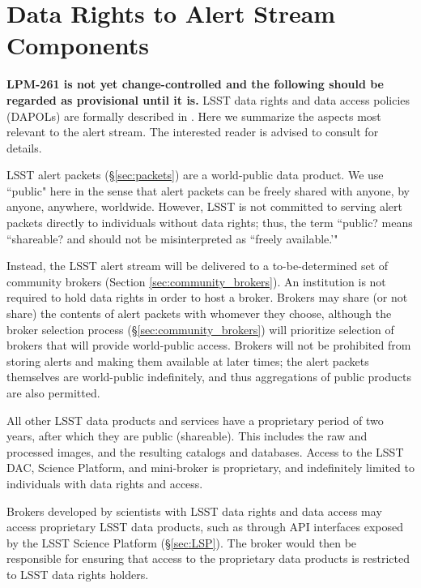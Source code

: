 \section{Data Rights to Alert Stream Components}\label{sec:data_rights}

\textbf{LPM-261 is not yet change-controlled and the following should be regarded as provisional until it is.}
LSST data rights and data access policies (DAPOLs) are formally described in .
Here we summarize the aspects most relevant to the alert stream.
The interested reader is advised to consult  for details.

LSST alert packets (\S \ref{sec:packets}) are a world-public data product.
We use ``public" here in the sense that alert packets can be freely shared with anyone, by anyone, anywhere, worldwide.
However, LSST is not committed to serving alert packets directly to individuals without data rights; thus, the term ``public? means ``shareable? and should not be misinterpreted as ``freely available.'"

Instead, the LSST alert stream will be delivered to a to-be-determined set of community brokers (Section \ref{sec:community_brokers}).
An institution is not required to hold data rights in order to host a broker.
Brokers may share (or not share) the contents of alert packets with whomever they choose, although the broker selection process (\S \ref{sec:community_brokers}) will prioritize selection of brokers that will provide world-public access.
Brokers will not be prohibited from storing alerts and making them available at later times; the alert packets themselves are world-public indefinitely, and thus aggregations of public products are also permitted.

All other LSST data products and services have a proprietary period of two years, after which they are public (shareable).
This includes the raw and processed images, and the resulting catalogs and databases.
Access to the LSST DAC, Science Platform, and mini-broker is proprietary, and indefinitely limited to individuals with data rights and access.

Brokers developed by scientists with LSST data rights and data access may access proprietary LSST data products, such as through API interfaces exposed by the LSST Science Platform  (\S \ref{sec:LSP}).
The broker would then be responsible for ensuring that access to the proprietary data products is restricted to LSST data rights holders.

